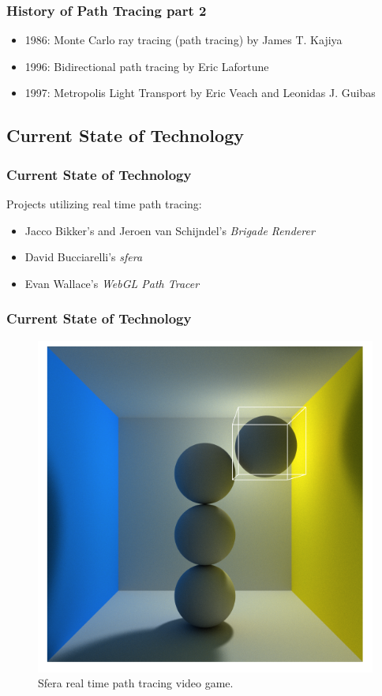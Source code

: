 \documentclass{beamer}
\begin{document}
\begin{frame}
    \frametitle{History of Path Tracing part 2}
    \begin{itemize}
        \item 1986: Monte Carlo ray tracing (path tracing) by James T. Kajiya
        \item 1996: Bidirectional path tracing by Eric Lafortune
        \item 1997: Metropolis Light Transport by Eric Veach and Leonidas J. Guibas
    \end{itemize}
\end{frame}

\subsection{Current State of Technology}
\begin{frame}
    \frametitle{Current State of Technology}
    Projects utilizing real time path tracing:
    \begin{itemize}
        \item Jacco Bikker's and Jeroen van Schijndel's \emph{Brigade Renderer}
        \item David Bucciarelli's \emph{sfera}
        \item Evan Wallace's \emph{WebGL Path Tracer}
    \end{itemize}
\end{frame}

\begin{frame}
    \frametitle{Current State of Technology}
    \begin{figure}[H]
        \includegraphics[scale=0.3]{webgl-pathtracer}
        \centering
        \caption{Sfera real time path tracing video game.}
    \end{figure}
\end{frame}
\end{document}
